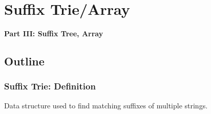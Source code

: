 
\section{Suffix Trie/Array} %

\begin{frame}
  \begin{center}
    {\bf Part III: Suffix Tree, Array}
  \end{center}
\end{frame}


\subsection{Outline}
\begin{frame}
  \frametitle{Suffix Trie: Definition}

  {\smaller
    \begin{block}{}
      Data structure used to find matching suffixes of multiple strings.
    \end{block}

    \vfill

    \begin{center}
    \end{center}

    \vfill

}
\end{frame}
